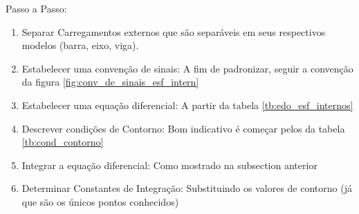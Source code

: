 \documentclass{article}
\begin{document}
            Passo a Passo:
            \begin{enumerate}\addtocounter{enumi}{-1}\tiny
                \item Separar Carregamentos externos que são separáveis em seus respectivos modelos (barra, eixo, viga).
                \item Estabelecer uma convenção de sinais: A fim de padronizar, seguir a convenção da figura \ref{fig:conv_de_sinais_esf_intern}
                \item Estabelecer uma equação diferencial: A partir da tabela \ref{tb:edo_esf_internos}
                \item Descrever condições de Contorno: Bom indicativo é começar pelos da tabela \ref{tb:cond_contorno}
                \item Integrar a equação diferencial: Como mostrado na subsection anterior
                \item Determinar Constantes de Integração: Substituindo os valores de contorno (já que são os únicos pontos conhecidos)
            \end{enumerate}




    
\end{document}
